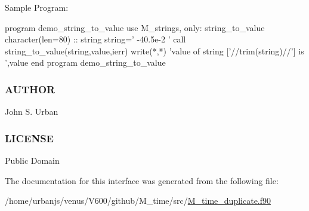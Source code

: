\begin{DoxyVerb}Sample Program:

 program demo_string_to_value
 use M_strings, only: string_to_value
 character(len=80) :: string
    string=' -40.5e-2 '
    call string_to_value(string,value,ierr)
    write(*,*) 'value of string ['//trim(string)//'] is ',value
 end program demo_string_to_value
\end{DoxyVerb}
 \subsubsection*{A\+U\+T\+H\+OR}

John S. Urban \subsubsection*{L\+I\+C\+E\+N\+SE}

Public Domain 

The documentation for this interface was generated from the following file\+:\begin{DoxyCompactItemize}
\item 
/home/urbanjs/venus/\+V600/github/\+M\+\_\+time/src/\mbox{\hyperlink{M__time__duplicate_8f90}{M\+\_\+time\+\_\+duplicate.\+f90}}\end{DoxyCompactItemize}
